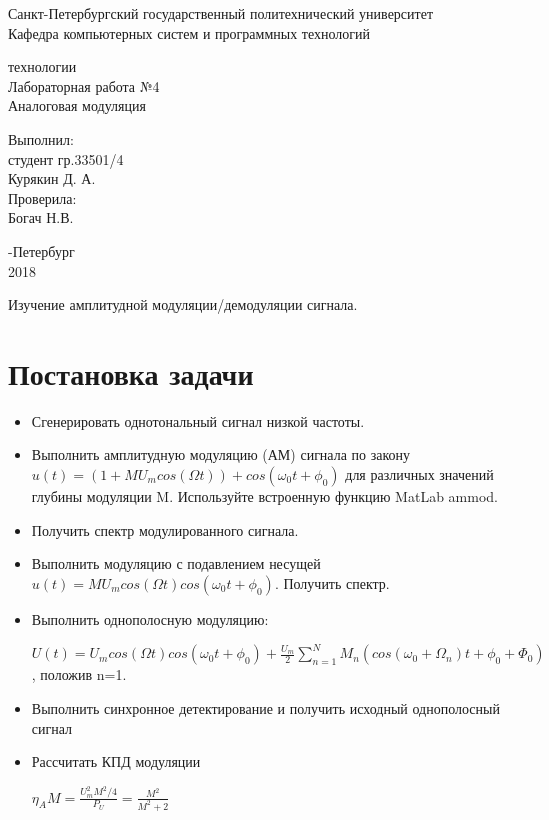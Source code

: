 \documentclass[a4paper,12pt]{article}
\begin{document}
\begin{center}
Санкт-Петербургский государственный политехнический университет
\\Кафедра компьютерных систем и программных технологий
\end{center}
\vspace*{10em plus .6em minus .5em}

\begin{center}
{ технологии
\\Лабораторная работа №4
\\Аналоговая модуляция}
\end{center}

\vspace*{5em plus .6em minus .5em}
\begin{flushright}
Выполнил:\\студент гр.33501/4\\Курякин Д. А.\\Проверила:\\Богач Н.В.
\end{flushright}

\vspace*{15em plus .6em minus .5em}
\begin{center}
{-Петербург
\\2018}
\end{center}
\pagestyle{empty}
\newpage
\pagestyle{plain}
{}

Изучение амплитудной модуляции/демодуляции сигнала.

\section{Постановка задачи}

\begin{itemize}
	\item Сгенерировать однотональный сигнал низкой частоты.
	\item Выполнить амплитудную модуляцию (АМ) сигнала по закону $u(t)=(1+MU_mcos(\Omega t))+cos(\omega_0t+\phi_0)$ для различных значений глубины модуляции M. Используйте встроенную функцию
	MatLab ammod.
	\item Получить спектр модулированного сигнала.
	\item Выполнить модуляцию с подавлением несущей $u(t)=MU_mcos(\Omega t)cos(\omega_0 t+\phi_0)$. Получить спектр.
	\item  Выполнить однополосную модуляцию:
		
	$U(t)=U_mcos(\Omega t)cos(\omega_0t+\phi_0)+\frac{U_m}{2}\sum_{n=1}^{N}M_n(cos(\omega_0+\Omega_n)t+\phi_0+\Phi_0)$, положив n=1.
	\item Выполнить синхронное детектирование и получить исходный однополосный сигнал
	\item Рассчитать КПД модуляции
	
	$\eta_AM=\frac{U_m^2M^2/4}{P_U}=\frac{M^2}{M^2+2}$
\end{itemize}
\end{document}
